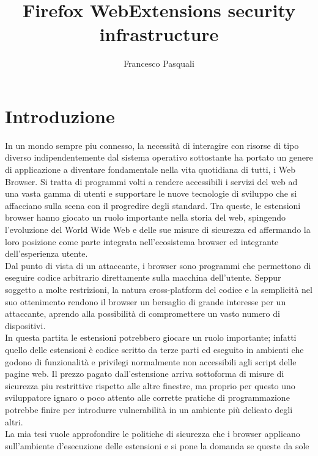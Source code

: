 \documentclass{sapthesis}
\title{Firefox WebExtensions security infrastructure}
\author{Francesco Pasquali}
\newcommand{\www}{World Wide Web}
\begin{document}
\maketitle
\tableofcontents
\newpage


\mainmatter
\chapter{Introduzione}
\label{cap:introduzione}

    In un mondo sempre piu connesso, la necessità di interagire con risorse di tipo diverso
    indipendentemente dal sistema operativo sottostante ha portato un genere di applicazione
    a diventare fondamentale nella vita quotidiana di tutti, i Web Browser. Si tratta di
    programmi volti a rendere accessibili i servizi del web ad una vasta gamma di utenti
    e supportare le nuove tecnologie di sviluppo che si affacciano sulla scena con il
    progredire degli standard. Tra queste, le estensioni browser hanno giocato un ruolo
    importante nella storia del web, spingendo l'evoluzione del \www{} e delle sue misure
    di sicurezza ed affermando la loro posizione come parte integrata nell'ecosistema browser 
    ed integrante dell'esperienza utente.\\
    Dal punto di vista di un attaccante, i browser sono programmi che permettono di eseguire
    codice arbitrario direttamente sulla macchina dell'utente.
    Seppur soggetto a molte restrizioni, la natura cross-platform del codice e la semplicità
    nel suo ottenimento rendono il browser un bersaglio di grande interesse per un attaccante,
    aprendo alla possibilità di compromettere un vasto numero di dispositivi.\\
    In questa partita le estensioni potrebbero giocare un ruolo importante; infatti quello delle estensioni è 
    codice scritto da terze parti ed eseguito in ambienti che godono di funzionalità e privilegi
    normalmente non accessibili agli script delle pagine web. Il prezzo pagato dall'estensione
    arriva sottoforma di misure di sicurezza piu restrittive rispetto alle altre finestre, ma
    proprio per questo uno sviluppatore ignaro o poco attento alle corrette pratiche di
    programmazione potrebbe finire per introdurre vulnerabilità in un ambiente più delicato
    degli altri.\\
    La mia tesi vuole approfondire le politiche di sicurezza che i browser
    applicano sull'ambiente d'esecuzione delle estensioni e si pone la domanda se queste da sole
\end{document}
